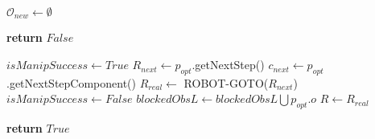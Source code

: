\begin{algorithm}[H]
\begin{algorithmic}[1]
            \State $\mathcal{O}_{new} \gets \emptyset$

          \EndIf

            \State \textbf{return} $False$ 
          \EndIf

          \State $isManipSuccess \gets True$
          \State $R_{next} \gets p_{opt}$.getNextStep() 
          \State $c_{next} \gets p_{opt}$.getNextStepComponent()
          \State $R_{real} \gets$ ROBOT-GOTO($R_{next}$)
            \State $isManipSuccess \gets False$
            \State $blockedObsL \gets blockedObsL \bigcup p_{opt}.o$
          \EndIf
          \State $R \gets R_{real}$

        \EndWhile

        \State \textbf{return} $True$

    \EndProcedure

  \end{algorithmic}

\end{algorithm}
